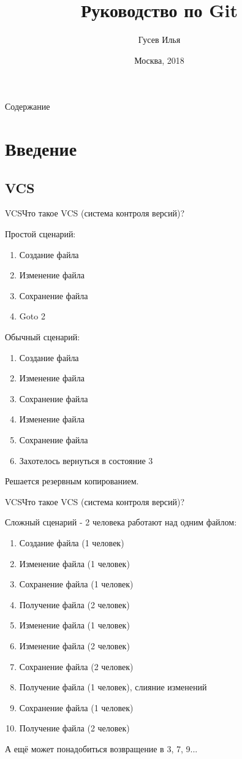 \documentclass[10pt]{beamer}
\title[\href{https://goo.gl/NRgp8K}{https://goo.gl/NRgp8K} (Term 1)]{Руководство по Git}
\author[Гусев Илья]{Гусев Илья}
\institute[МФТИ] 
{Московский физико-технический институт\\*}
\date{Москва, 2018}
\begin{document}
\begin{frame}
  \titlepage
\end{frame}

\begin{frame}{Содержание}
\tableofcontents
\end{frame}

\section{Введение}

\subsection{VCS}
\begin{frame}[fragile]{VCS}{Что такое VCS (система контроля версий)?}
\begin{multicols}{2}
Простой сценарий:
\begin{enumerate}
\item Создание файла
\item Изменение файла
\item Сохранение файла
\item Goto 2
\end{enumerate}
\vfill\eject
Обычный сценарий:
\begin{enumerate}
\item Создание файла
\item Изменение файла
\item Сохранение файла
\item Изменение файла
\item Сохранение файла
\item Захотелось вернуться в состояние 3
\end{enumerate}
Решается резервным копированием.
\end{multicols}
\end{frame}

\begin{frame}[fragile]{VCS}{Что такое VCS (система контроля версий)?}
\begin{multicols}{2}
Сложный сценарий - 2 человека работают над одним файлом:
\begin{enumerate}
\item Создание файла (1 человек)
\item Изменение файла (1 человек)
\item Сохранение файла (1 человек)
\item Получение файла (2 человек)
\item Изменение файла (1 человек)
\item Изменение файла (2 человек)
\item Сохранение файла (2 человек)
\item Получение файла (1 человек), слияние изменений
\item Сохранение файла (1 человек)
\item Получение файла (2 человек)
\end{enumerate}
\end{multicols}
А ещё может понадобиться возвращение в 3, 7, 9...
\end{frame}
\end{document}
